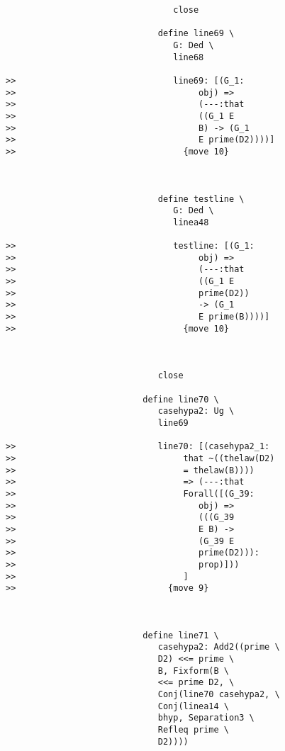\documentclass[12pt]{article}
\begin{document}
\begin{verbatim}
                                 close

                              define line69 \
                                 G: Ded \
                                 line68

>>                               line69: [(G_1:
>>                                    obj) =>
>>                                    (---:that
>>                                    ((G_1 E
>>                                    B) -> (G_1
>>                                    E prime(D2))))]
>>                                 {move 10}



                              define testline \
                                 G: Ded \
                                 linea48

>>                               testline: [(G_1:
>>                                    obj) =>
>>                                    (---:that
>>                                    ((G_1 E
>>                                    prime(D2))
>>                                    -> (G_1
>>                                    E prime(B))))]
>>                                 {move 10}



                              close

                           define line70 \
                              casehypa2: Ug \
                              line69

>>                            line70: [(casehypa2_1:
>>                                 that ~((thelaw(D2)
>>                                 = thelaw(B))))
>>                                 => (---:that
>>                                 Forall([(G_39:
>>                                    obj) =>
>>                                    (((G_39
>>                                    E B) ->
>>                                    (G_39 E
>>                                    prime(D2))):
>>                                    prop)]))
>>                                 ]
>>                              {move 9}



                           define line71 \
                              casehypa2: Add2((prime \
                              D2) <<= prime \
                              B, Fixform(B \
                              <<= prime D2, \
                              Conj(line70 casehypa2, \
                              Conj(linea14 \
                              bhyp, Separation3 \
                              Refleq prime \
                              D2))))


\end{verbatim}
\end{document}
